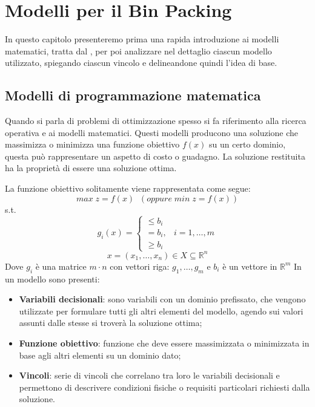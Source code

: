 
\hypertarget{(chap:capitolo4)}{}
\chapter{Modelli per il Bin Packing}
In questo capitolo presenteremo prima una rapida introduzione ai modelli matematici, tratta dal , per poi analizzare nel dettaglio ciascun modello utilizzato, spiegando ciascun vincolo e delineandone quindi l'idea di base.
\section{Modelli di programmazione matematica}
Quando si parla di problemi di ottimizzazione spesso si fa riferimento alla ricerca operativa e ai modelli matematici. Questi modelli producono una soluzione che massimizza o minimizza una funzione obiettivo $f ( x ) $ su un certo dominio, questa può rappresentare un aspetto di costo o guadagno.
La soluzione restituita ha la proprietà di essere una soluzione ottima. 

La funzione obiettivo solitamente viene rappresentata come segue:
$$ max\; z = f ( x )\;\; (oppure\; min\; z = f ( x ))$$
s.t.
$$g_i (x) = \begin{cases} \leq b_i \\ = b_i, & i = 1,\dots,m \\ \geq b_i \end{cases}$$
$$x = (x_1,\dots,x_n) \in X \subseteq \mathbb{R}^n$$
Dove $g_i$ è una matrice $m \cdot n$ con vettori riga: $g_1,\dots,g_m$ e $b_i$ è un vettore in $\mathbb{R}^{m}$
In un modello sono presenti:
\begin{itemize}
	\item \textbf{Variabili decisionali}: sono variabili con un dominio prefissato, che vengono utilizzate per formulare tutti gli altri elementi del modello, agendo sui valori assunti dalle stesse si troverà la soluzione ottima;
	\item \textbf{Funzione obiettivo}: funzione che deve essere massimizzata o minimizzata in base agli altri elementi su un dominio dato;
	\item \textbf{Vincoli}: serie di vincoli che correlano tra loro le variabili decisionali e permettono di descrivere condizioni fisiche o requisiti particolari richiesti dalla soluzione.
\end{itemize}
